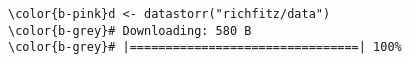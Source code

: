 \documentclass[class=minimal,border=0]{standalone}
\begin{document}
%
\begin{BVerbatim}[bgcolor=b-darkgrey]
\color{b-pink}d <- datastorr("richfitz/data")
\color{b-grey}# Downloading: 580 B
\color{b-grey}# |================================| 100%
\end{BVerbatim}
\end{document}
